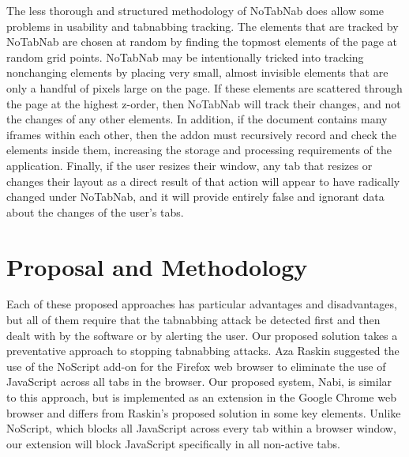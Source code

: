 \documentclass[12pt]{article}
\begin{document}
\begin{doublespace}
The less thorough and structured methodology of NoTabNab does allow some problems in usability and tabnabbing tracking.  The elements that are tracked by NoTabNab are chosen at random by finding the topmost elements of the page at random grid points.  NoTabNab may be intentionally tricked into tracking nonchanging elements by placing very small, almost invisible elements that are only a handful of pixels large on the page.  If these elements are scattered through the page at the highest z-order, then NoTabNab will track their changes, and not the changes of any other elements.  In addition, if the document contains many iframes within each other, then the addon must recursively record and check the elements inside them, increasing the storage and processing requirements of the application.  Finally, if the user resizes their window, any tab that resizes or changes their layout as a direct result of that action will appear to have radically changed under NoTabNab, and it will provide entirely false and ignorant data about the changes of the user's tabs.

\section{Proposal and Methodology}
\begin{comment}
Each of these approaches has advantages and disadvantages, but one particular disadvantage all these methods possess is that they are all only detection programs. We believe that a preventative method is a more effective way to combat tabnabbing.
We propose a web browser extension to prevent attackers from executing their tabnabbing attacks. Aza Raskin suggested the use of the NoScript add-on for the Firefox web browser to eliminate the use of JavaScript across all tabs in the browser.  Our proposed system is similar to this approach, but is implemented in the Google Chrome web browser and differs from Raskin’s proposed solution in some key elements. Unlike NoScript, which blocks all JavaScript across every tab within a browser window, our extension will block JavaScript specifically in all non-active tabs that are not part of a trusted whitelist.  
\end{comment}
Each of these proposed approaches has particular advantages and disadvantages, but all of them require that the tabnabbing attack be detected first and then dealt with by the software or by alerting the user. Our proposed solution takes a preventative approach to stopping tabnabbing attacks. Aza Raskin suggested the use of the NoScript add-on for the Firefox web browser to eliminate the use of JavaScript across all tabs in the browser. Our proposed system, Nabi, is similar to this approach, but is implemented as an extension in the Google Chrome web browser and differs from Raskin’s proposed solution in some key elements. Unlike NoScript, which blocks all JavaScript across every tab within a browser window, our extension will block JavaScript specifically in all non-active tabs.


\end{doublespace}
\end{document}
